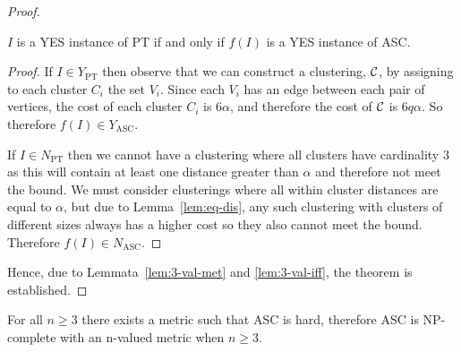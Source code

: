 \begin{proof}
  \begin{lem}
    \label{lem:3-val-iff}
    $I$ is a YES instance of PT if and only if $f(I)$ is a YES instance of ASC.
  \end{lem}

  \begin{proof}
    If $I \in Y_{\text{PT}}$ then observe that we can construct a clustering,
    $\mathcal{C}$, by assigning to each cluster $C_i$ the set $V_i$.  Since each
    $V_i$ has an edge between each pair of vertices, the cost of each cluster
    $C_i$ is $6\alpha$, and therefore the cost of $\mathcal{C}$ is $6q\alpha$.  So
    therefore $f(I) \in Y_{\text{ASC}}$.

    If $I \in N_{\text{PT}}$ then we cannot have a clustering where all
    clusters have cardinality $3$ as this will contain at least one distance
    greater than $\alpha$ and therefore not meet the bound.  We must consider
    clusterings where all within cluster distances are equal to $\alpha$, but
    due to Lemma~\ref{lem:eq-dis}, any such clustering with clusters of
    different sizes always has a higher cost so they also cannot meet the
    bound.  Therefore $f(I) \in N_{\text{ASC}}$.
  \end{proof}

  Hence, due to Lemmata~\ref{lem:3-val-met} and \ref{lem:3-val-iff}, the
  theorem is established.

\end{proof}

\begin{thm}
  \label{thm:asc-np-complete-n-val}
  For all $n \geq 3$ there exists a metric such that ASC is hard, therefore
  ASC is NP-complete with an n-valued metric when $n \geq 3$.
\end{thm}

